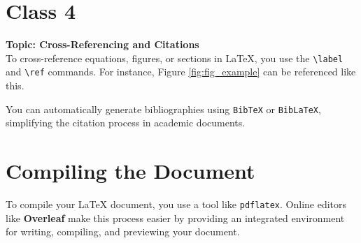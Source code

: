 \section*{Class 4}
\textbf{Topic: Cross-Referencing and Citations} \\

To cross-reference equations, figures, or sections in \LaTeX{}, you use the \verb|\label| and \verb|\ref| commands. For instance, Figure \ref{fig:fig_example} can be referenced like this.

You can automatically generate bibliographies using \texttt{BibTeX} or \texttt{BibLaTeX}, simplifying the citation process in academic documents.

\section{Compiling the Document}
To compile your \LaTeX{} document, you use a tool like \texttt{pdflatex}. Online editors like \textbf{Overleaf} make this process easier by providing an integrated environment for writing, compiling, and previewing your document.
